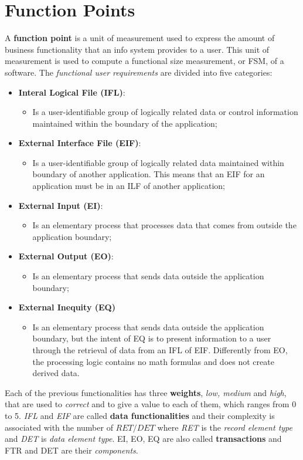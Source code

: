 \documentclass{article}
\begin{document}
\section{Function Points}
A \textbf{function point} is a unit of measurement used to express the amount of business functionality that an info system provides to a user. This unit of measurement is used to compute a functional size measurement, or FSM, of a software. The \emph{functional user requirements} are divided into five categories: 
\begin{itemize}
\item \textbf{Interal Logical File (IFL)}:
\begin{itemize}
\item Is a user-identifiable group of logically related data or control information maintained within the boundary of the application;
\end{itemize}
\item \textbf{External Interface File (EIF)}:
\begin{itemize}
\item Is a user-identifiable group of logically related data maintained within boundary of another application. This means that an EIF for an application must be in an ILF of another application;
\end{itemize}
\item \textbf{External Input (EI)}:
\begin{itemize}
\item Is an elementary process that processes data that comes from outside the application boundary;
\end{itemize}
\item \textbf{External Output (EO)}:
\begin{itemize}
\item Is an elementary process that sends data outside the application boundary;
\end{itemize}
\item \textbf{External Inequity (EQ)}
\begin{itemize}
\item Is an elementary process that sends data outside the application boundary, but the intent of EQ is to present information to a user through the retrieval of data from an IFL of EIF. Differently from EO, the processing logic contains no math formulas and does not create derived data.
\end{itemize}
\end{itemize}
Each of the previous functionalities has three \textbf{weights}, \emph{low, medium} and \emph{high}, that are used to \emph{correct} and to give a value to each of them, which ranges from 0 to 5. \emph{IFL} and \emph{EIF} are called \textbf{data functionalities} and their complexity is associated with the number of $RET/DET$ where \emph{RET} is the \emph{record element type} and \emph{DET} is \emph{data element type}. EI, EO, EQ are also called \textbf{transactions} and FTR and DET are their \emph{components}. 
\clearpage
\end{document}
